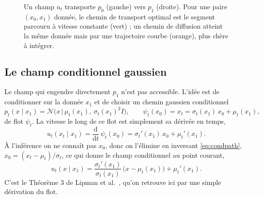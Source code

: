 \documentclass[11pt]{article}
\begin{document}
\begin{figure}[htbp]
\centering
{}
\caption{Un champ $u_t$ transporte $p_0$ (gauche) vers $p_1$ (droite). Pour une paire $(x_0,x_1)$ donnée, le
chemin de transport optimal est le segment parcouru à vitesse constante (vert) ; un chemin de diffusion
atteint la même donnée mais par une trajectoire courbe (orange), plus chère à intégrer.}
\label{fig:generative}
\end{figure}

\subsection{Le champ conditionnel gaussien}
\label{sec:th3}

Le champ qui engendre directement $p_1$ n'est pas accessible. L'idée est de conditionner sur la donnée
$x_1$ et de choisir un chemin gaussien conditionnel
\begin{equation}
p_t(x \mid x_1) = \mathcal{N}\!\big(x \,\big|\, \mu_t(x_1),\ \sigma_t(x_1)^2 I\big),
\qquad
\psi_t(x_0) = x_t = \sigma_t(x_1)\,x_0 + \mu_t(x_1),
\label{eq:condpath}
\end{equation}
de flot $\psi_t$. La vitesse le long de ce flot est simplement sa dérivée en temps,
\begin{equation}
u_t(x_t \mid x_1) = \frac{\mathrm{d}}{\mathrm{d}t}\,\psi_t(x_0) = \sigma_t'(x_1)\,x_0 + \mu_t'(x_1).
\label{eq:psidot}
\end{equation}
À l'inférence on ne connaît pas $x_0$, donc on l'élimine en inversant \eqref{eq:condpath},
$x_0 = (x_t - \mu_t)/\sigma_t$, ce qui donne le champ conditionnel au point courant,
\begin{equation}
u_t(x \mid x_1) = \frac{\sigma_t'(x_1)}{\sigma_t(x_1)}\,\big(x - \mu_t(x_1)\big) + \mu_t'(x_1).
\label{eq:th3}
\end{equation}
C'est le Théorème 3 de Lipman et al.~\cite{lipman2023flow}, qu'on retrouve ici par une simple dérivation du
flot.
\end{document}
